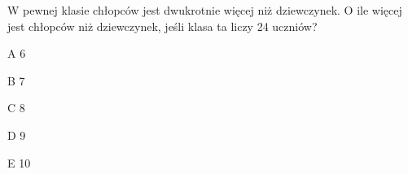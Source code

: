 \begin{tresc}
W pewnej klasie chłopców jest dwukrotnie więcej niż dziewczynek. O ile więcej jest chłopców niż dziewczynek, jeśli klasa ta liczy 24 uczniów?
\end{tresc}
\begin{wariant}{A} 6 \end{wariant}
\begin{wariant}{B} 7 \end{wariant}
\begin{wariant}{C} 8 \end{wariant}
\begin{wariant}{D} 9 \end{wariant}
\begin{wariant}{E} 10 \end{wariant}

